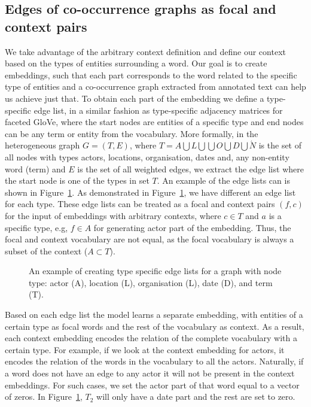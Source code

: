 \subsection{Edges of co-occurrence graphs as focal and context pairs}
We take advantage of the arbitrary context definition and define our context based on the types of entities surrounding a word. Our goal is to create embeddings, such that each part corresponds to the word related to the specific type of entities and a co-occurrence graph extracted from annotated text can help us achieve just that. To obtain each part of the embedding we define a type-specific edge list, in a similar fashion as type-specific adjacency matrices for faceted GloVe, where the start nodes are entities of a specific type and end nodes can be any term or entity from the vocabulary. More formally, in the heterogeneous graph $G=(T,E)$, where $T=A\bigcup  L\bigcup  \bigcup  O\bigcup  D\bigcup  \acute {N} $ is the set of all nodes with types actors, locations, organisation, dates and, any non-entity word (term) and $E$ is the set of all weighted edges, we extract the edge list where the start node is one of the types in set $T$. An example of the edge lists can is shown in Figure~\ref{fig:facettedword2vec}. As demonstrated in Figure~\ref{fig:facettedword2vec}, we have different an edge list for each type. These edge lists can be treated as a focal and context pairs $(f,c)$ for the input of embeddings with arbitrary contexts, where $c \in T$ and $a$ is a specific type, e.g, $f \in A$ for generating actor part of the embedding. Thus, the focal and context vocabulary are not equal, as the focal vocabulary is always a subset of the context ($A \subset  T$). 
\begin{figure}
\centering 
\resizebox{0.80\textwidth}{0.28\textwidth}{      

}
\caption{ An example of creating type specific edge lists for a graph with node type: actor (A), location (L), organisation (L), date (D), and term (T).  }
\label{fig:facettedword2vec}
\end{figure} 
Based on each edge list the model learns a separate embedding, with entities of a certain type as focal words and the rest of the vocabulary as context. As a result, each context embedding encodes the relation of the complete vocabulary with a certain type. For example, if we look at the context embedding for actors, it encodes the relation of the words in the vocabulary to all the actors. Naturally, if a word does not have an edge to any actor it will not be present in the context embeddings. For such cases, we set the actor part of that word equal to a vector of zeros. In Figure~\ref{fig:facettedword2vec}, $T_2$ will only have a date part and the rest are set to zero. 
